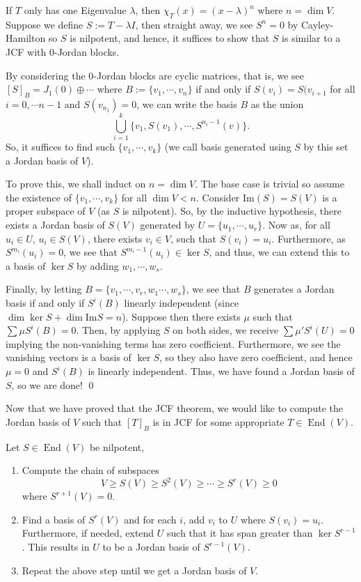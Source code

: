 \documentclass[
]{article}
\theoremstyle{definition}
\begin{document}
If \(T\) only has one Eigenvalue \(\lambda\), then
\(\chi_T(x) = (x - \lambda)^n\) where \(n = \dim V\). Suppose we define
\(S := T - \lambda I\), then straight away, we see \(S^n = 0\) by
Cayley-Hamilton so \(S\) is nilpotent, and hence, it suffices to show
that \(S\) is similar to a JCF with 0-Jordan blocks.

By considering the 0-Jordan blocks are cyclic matrices, that is, we see
\([S]_B = J_{1}(0) \oplus \cdots\) where \(B := \{v_1, \cdots, v_n\}\)
if and only if \(S(v_i) = S(v_{i + 1}\) for all \(i = 0, \cdots n - 1\)
and \(S(v_{n_1}) = 0\), we can write the basis \(B\) as the union
\[\bigcup_{i = 1}^k \{v_1, S(v_1), \cdots, S^{n_i - 1}(v)\}.\] So, it
suffices to find such \(\{v_1, \cdots, v_k\}\) (we call basis generated
using \(S\) by this set a Jordan basis of \(V\)).

To prove this, we shall induct on \(n = \dim V\). The base case is
trivial so assume the existence of \(\{v_1, \cdots, v_k\}\) for all
\(\dim V < n\). Consider \(\text{Im}(S) = S(V)\) is a proper subspace of
\(V\) (as \(S\) is nilpotent). So, by the inductive hypothesis, there
exists a Jordan basis of \(S(V)\) generated by
\(U = \{u_1, \cdots, u_r\}\). Now as, for all \(u_i \in U\),
\(u_i \in S(V)\), there exists \(v_i \in V\), such that
\(S(v_i) = u_i\). Furthermore, as \(S^{m_i}(u_i) = 0\), we see that
\(S^{m_i - 1}(u_i) \in \ker S\), and thus, we can extend this to a basis
of \(\ker S\) by adding \(w_1, \cdots, w_s\).

Finally, by letting \(B = \{v_1, \cdots, v_r, w_1 \cdots, w_s\}\), we
see that \(B\) generates a Jordan basis if and only if \(S^i(B)\)
linearly independent (since \(\dim \ker S + \dim \text{Im} S = n\)).
Suppose then there exists \(\mu\) such that \(\sum \mu S^i(B) = 0\).
Then, by applying \(S\) on both sides, we receive
\(\sum \mu'S^i(U) = 0\) implying the non-vanishing terms has zero
coefficient. Furthermore, we see the vanishing vectors is a basis of
\(\ker S\), so they also have zero coefficient, and hence \(\mu = 0\)
and \(S^i(B)\) is linearly independent. Thus, we have found a Jordan
basis of \(S\), so we are done! \qed

Now that we have proved that the JCF theorem, we would like to compute
the Jordan basis of \(V\) such that \([T]_B\) is in JCF for some
appropriate \(T \in \mathop{\mathrm{End}}(V)\).

Let \(S \in \mathop{\mathrm{End}}(V)\) be nilpotent,

\begin{enumerate}
  \item Compute the chain of subspaces
    \[V \ge S(V) \ge S^2(V) \ge \cdots \ge S^r(V) \ge 0\]
    where \(S^{r + 1}(V) = 0\).
  \item Find a basis of \(S^r(V)\) and for each \(i\), add \(v_i\) to \(U\) where 
    \(S(v_i) = u_i\). Furthermore, if needed, extend \(U\) such that it has span 
    greater than \(\ker S^{r - 1}\). This results in \(U\) to be a Jordan basis of \(S^{r - 1}(V)\).
  \item Repeat the above step until we get a Jordan basis of \(V\).
\end{enumerate}
\end{document}
